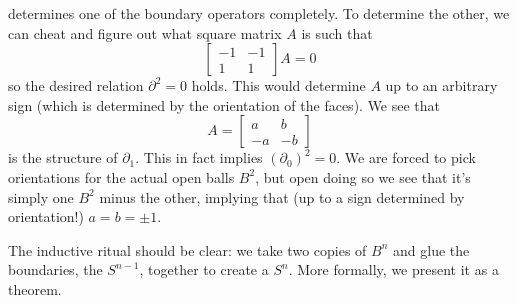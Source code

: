 determines one of the boundary operators completely. To determine
the other, we can cheat and figure out what square matrix $A$ is such
that
\begin{equation}%
\begin{bmatrix} -1 & -1\\1 & 1\end{bmatrix}A = 0
\end{equation}
so the desired relation $\partial^{2}=0$ holds. This would
determine $A$ up to an arbitrary sign (which is determined by the
orientation of the faces). We see that
\begin{equation}%
A = \begin{bmatrix}a & b\\
-a & -b\end{bmatrix}
\end{equation}
is the structure of $\partial_{1}$. This in fact implies
$(\partial_{0})^{2}=0$. We are forced to pick orientations for
the actual open balls $B^{2}$, but open doing so we see that it's
simply one $B^{2}$ minus the other, implying that (up to a sign
determined by orientation!) $a=b=\pm1$.

The inductive ritual should be clear: we take two copies of
$B^{n}$ and glue the boundaries, the $S^{n-1}$, together to
create a $S^{n}$. More formally, we present it as a theorem.

